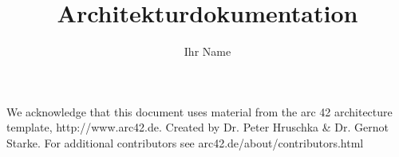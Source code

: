 
\begin{titlepage}
\author{Ihr Name} 
\title{Architekturdokumentation} 
\date{} 
\maketitle


We acknowledge that this document uses material from the arc 42 architecture 
template, http://www.arc42.de. Created by Dr. Peter Hruschka \& Dr. Gernot Starke. For additional contributors see arc42.de/about/contributors.html
\end{titlepage}
\newpage